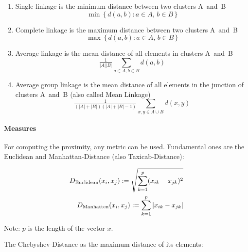 					\begin{enumerate}
						\item{Single linkage is the minimum distance between two clusters \mbox{A and B}
						\begin{equation}
							\min \, \{\, d(a,b) : a \in A,\, b \in B \,\}
						\end{equation}}
						
						\item{Complete linkage is the maximum distance between two clusters 	\mbox{A and B}
						\begin{equation}
							\max \, \{\, d(a,b) : a \in A,\, b \in B \,\}
						\end{equation}}
	
						\item{Average linkage is the mean distance of all elements in clusters \mbox{A and B}
						\begin{equation}
							\tfrac{1}{|A||B|}\sum_{a\in A, b\in B} d(a,b)
						\end{equation}}
						
						\item{Average group linkage is the mean distance of all elements in the junction of clusters \mbox{A and B} (also called Mean Linkage)
						\begin{equation}
							\tfrac{1}{(|A|+|B|)(|A|+|B|-1)}\sum_{x,y\in A \cup B} d(x,y)
						\end{equation}}
					\end{enumerate}

					\paragraph{Measures}
					\label{para:measures}
					
						For computing the proximity, any metric can be used. Fundamental ones are the Euclidean and Manhattan-Distance (also Taxicab-Distance):

						\begin{eqnarray}
							D_{\rm Euclidean}(x_i,x_j) :=\sqrt{\sum_{k=1}^p (x_{ik}-x_{jk})^2} \label{eqn:euclidean}\\
							D_{\rm Manhatten}(x_i,x_j) :=\sum_{k=1}^p |x_{ik}-x_{jk}|				\label{eqn:manhatten}
						\end{eqnarray}

						Note: $p$ is the length of the vector $x$.
						
						The Chebyshev-Distance as the maximum distance of its elements:

